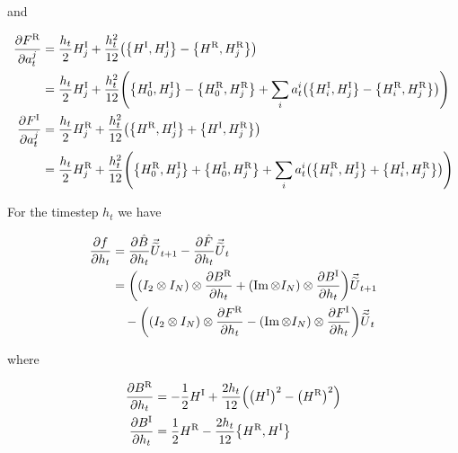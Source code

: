 \documentclass{article}
\newcommand{\isoU}{\widetilde{U}}
\newcommand{\isovecU}{\vec{\widetilde{U}}}
\newcommand{\isovec}{\text{isovec}}
\newcommand{\HI}{H^{\text{I}}}
\newcommand{\HR}{H^{\text{R}}}
\newcommand{\BR}{B^{\text{R}}}
\newcommand{\BI}{B^{\text{I}}}
\newcommand{\FR}{F^{\text{R}}}
\newcommand{\FI}{F^{\text{I}}}
\newcommand{\UR}{U^{\text{R}}}
\newcommand{\UI}{U^{\text{I}}}
\begin{document}
and 

\begin{align*}
  \pdv{\FR}{a^j_t} &= \frac{h_t}{2} \HI_j + \frac{h_t^2}{12} \qty(\qty{\HI,\HI_j} - \qty{\HR, \HR_j}) \\
  &= \frac{h_t}{2} \HI_j + \frac{h_t^2}{12} \qty(\qty{\HI_0, \HI_j} - \qty{\HR_0, \HR_j} + \sum_i a^i_t \qty(\qty{\HI_i, \HI_j} - \qty{\HR_i, \HR_j})) \\
  \pdv{\FI}{a^j_t} &= \frac{h_t}{2} \HR_j + \frac{h_t^2}{12} \qty(\qty{\HR,\HI_j} + \qty{\HI,\HR_j})\\
  &= \frac{h_t}{2} \HR_j + \frac{h_t^2}{12} \qty(\qty{\HR_0,\HI_j} + \qty{\HI_0,\HR_j} + \sum_i a^i_t \qty(\qty{\HR_i,\HI_j} + \qty{\HI_i,\HR_j})) \\
\end{align*}

For the timestep $h_t$ we have

\begin{align*}
  \pdv{f}{h_t} %
  &= \pdv{\hat B}{h_t} \isovecU_{t+1} - \pdv{\hat F}{h_t} \isovecU_{t} \\
  &= \qty((I_2 \otimes I_N) \otimes \pdv{\BR}{h_t} + (\Im \otimes I_N) \otimes \pdv{\BI}{h_t}) \isovecU_{t+1} \\
  & \quad - \qty((I_2 \otimes I_N) \otimes \pdv{\FR}{h_t} - (\Im \otimes I_N) \otimes \pdv{\FI}{h_t}) \isovecU_{t}
\end{align*}

where 

\begin{align*} 
  \pdv{\BR}{h_t} &= -\frac{1}{2} \HI + \frac{2h_t}{12} \qty(\qty(\HI)^2 - \qty(\HR)^2) \\
  \pdv{\BI}{h_t} &= \frac{1}{2} \HR - \frac{2h_t}{12} \qty{\HR,\HI}
\end{align*}
\end{document}
